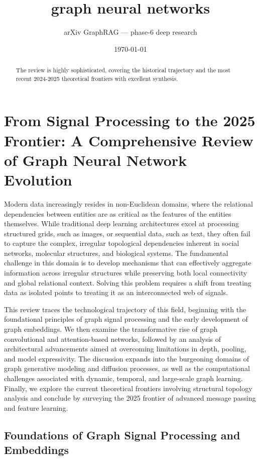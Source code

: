 \documentclass[11pt]{article}
\title{graph neural networks}
\author{arXiv GraphRAG --- phase-6 deep research}
\date{\today}
\begin{document}
\maketitle

\begin{abstract}
The review is highly sophisticated, covering the historical trajectory and the most recent 2024-2025 theoretical frontiers with excellent synthesis.
\end{abstract}

\section{From Signal Processing to the 2025 Frontier: A Comprehensive Review of Graph Neural Network Evolution}

Modern data increasingly resides in non-Euclidean domains, where the relational dependencies between entities are as critical as the features of the entities themselves. While traditional deep learning architectures excel at processing structured grids, such as images, or sequential data, such as text, they often fail to capture the complex, irregular topological dependencies inherent in social networks, molecular structures, and biological systems. The fundamental challenge in this domain is to develop mechanisms that can effectively aggregate information across irregular structures while preserving both local connectivity and global relational context. Solving this problem requires a shift from treating data as isolated points to treating it as an interconnected web of signals.

This review traces the technological trajectory of this field, beginning with the foundational principles of graph signal processing and the early development of graph embeddings. We then examine the transformative rise of graph convolutional and attention-based networks, followed by an analysis of architectural advancements aimed at overcoming limitations in depth, pooling, and model expressivity. The discussion expands into the burgeoning domains of graph generative modeling and diffusion processes, as well as the computational challenges associated with dynamic, temporal, and large-scale graph learning. Finally, we explore the current theoretical frontiers involving structural topology analysis and conclude by surveying the 2025 frontier of advanced message passing and feature learning.

\subsection{Foundations of Graph Signal Processing and Embeddings}
\end{document}
